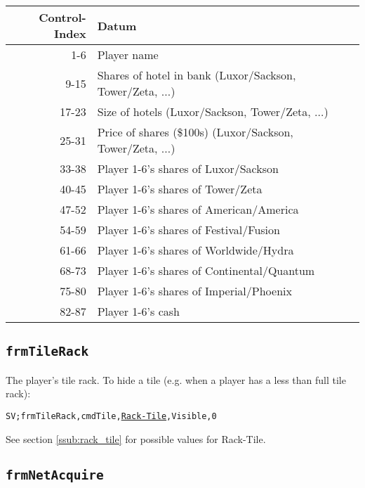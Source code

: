 \documentclass{article}
\providecommand{\wiredata}[1]{\texttt{{#1}}}
\begin{document}
\begin{tabular}{r|l}
  Control-Index & Datum                                                  \\
  \hline
   1-6  & Player name                                                    \\
   9-15 & Shares of hotel in bank (Luxor/Sackson, Tower/Zeta, $\ldots$)  \\
  17-23 & Size of hotels (Luxor/Sackson, Tower/Zeta, $\ldots$)           \\
  25-31 & Price of shares (\$100s) (Luxor/Sackson, Tower/Zeta, $\ldots$) \\
  33-38 & Player 1-6's shares of Luxor/Sackson                           \\
  40-45 & Player 1-6's shares of Tower/Zeta                              \\
  47-52 & Player 1-6's shares of American/America                        \\
  54-59 & Player 1-6's shares of Festival/Fusion                         \\
  61-66 & Player 1-6's shares of Worldwide/Hydra                         \\
  68-73 & Player 1-6's shares of Continental/Quantum                     \\
  75-80 & Player 1-6's shares of Imperial/Phoenix                        \\
  82-87 & Player 1-6's cash
\end{tabular}


\subsection{\texttt{frmTileRack}} %
\label{sub:frmtilerack}

The player's tile rack. To hide a tile (e.g. when a player has a less than full tile rack):

\wiredata{SV;frmTileRack,cmdTile,\textrm{\hyperref[ssub:rack_tile]{Rack-Tile}},Visible,0}

See section \ref{ssub:rack_tile} for possible values for Rack-Tile.


\subsection{\texttt{frmNetAcquire}} %
\label{sub:frmnetacquire}
\end{document}
